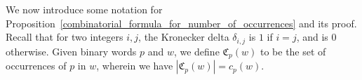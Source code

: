 \documentclass[11pt]{amsart}
\begin{document}
We now introduce some notation for Proposition~\ref{combinatorial_formula_for_number_of_occurrences} and its proof. Recall that for two integers $i,j$, the Kronecker delta $\delta_{i,j}$ is $1$ if $i=j$, and is $0$ otherwise. Given binary words $p$ and $w$, we define $\mathfrak{C}_p(w)$ to be the set of occurrences of $p$ in $w$, wherein we have $|\mathfrak{C}_p(w)|=c_p(w)$.





\end{document}
